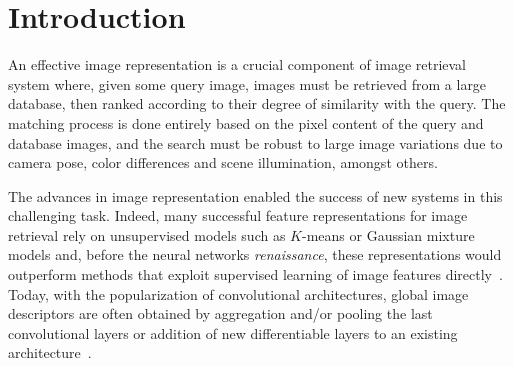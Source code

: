 \section{Introduction}



An effective image 
representation is a crucial component of image retrieval system
where, given some query image,  images must be retrieved from a large 
database, then ranked according to their degree of similarity with the 
query.
The matching process is done entirely based on the pixel content of the query and database images, and the search must be robust to large image variations due to camera pose, color differences and scene illumination, amongst others.


The advances in image representation enabled the success of new systems in this challenging task. %
Indeed, many successful feature representations for image retrieval rely on unsupervised models such as $K$-means \cite{Delhumeau2013} or Gaussian mixture models \cite{Perronnin2010} and, before the neural networks \textit{renaissance}, these representations would outperform methods that exploit supervised learning of image features directly~\cite{Bilen2015,Rana}.
Today, with the popularization of convolutional architectures, global image descriptors are often obtained by aggregation and/or pooling the last convolutional layers \cite{babenko15,GoAlReLa16,KaMeOs16} or addition of new differentiable layers to an existing architecture~\cite{Arandjelovic15}.

